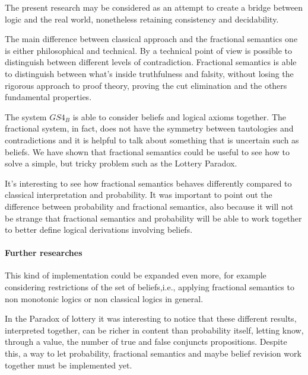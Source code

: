 \documentclass[a4paper, 12pt, oneside]{article}
\theoremstyle{plain}
\theoremstyle{definition}
\begin{document}
The present research may be considered as an attempt to create a bridge between logic and the real world, nonetheless retaining consistency and decidability.

The main difference between classical approach and the fractional semantics one is either philosophical and technical. By a technical point of view is possible to distinguish between different levels of contradiction. Fractional semantics is able to distinguish between what's inside truthfulness and falsity, without losing the rigorous approach to proof theory, proving the cut elimination and the others fundamental properties. 

The system $GS4_B$ is able to consider beliefs and logical axioms together. The fractional system, in fact, does not have the symmetry between tautologies and contradictions and it is helpful to talk about something that is uncertain such as beliefs. We have shown that fractional semantics could be useful to see how to solve a simple, but tricky problem such as the Lottery Paradox. 

It's interesting to see how fractional semantics behaves differently compared to classical interpretation and probability. It was important to point out the difference between probability and fractional semantics, also because it will not be strange that fractional semantics and probability will be able to work together to better define logical derivations involving beliefs. 



\paragraph{Further researches} This kind of implementation could be expanded even more, for example considering restrictions of the set of beliefs,i.e., applying fractional semantics to non monotonic logics or non classical logics in general.

In the Paradox of lottery it was interesting to notice that these different results, interpreted together, can be richer in content than probability itself, letting know, through a value, the number of true and false conjuncts propositions. Despite this, a way to let probability, fractional semantics and maybe belief revision work together must be implemented yet.

\nocite{*}

\printbibliography
\end{document}
